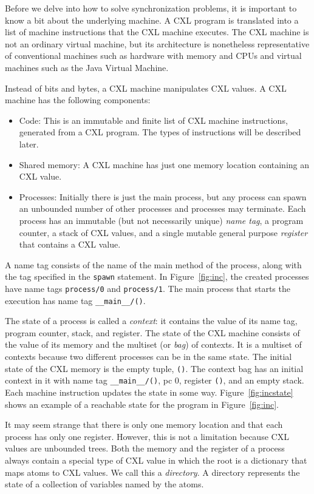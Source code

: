 \documentclass{report}
\begin{document}
Before we delve into how to solve synchronization problems, it is important
to know a bit about the underlying machine.  A CXL program is translated
into a list of machine instructions that the CXL machine executes.
The CXL machine is not an ordinary virtual machine, but its architecture
is nonetheless representative of conventional machines such as hardware
with memory and CPUs and virtual machines such as the Java Virtual Machine.

Instead of bits and bytes, a CXL machine manipulates CXL values.
A CXL machine has the following components:
\begin{itemize}
\item Code:  This is an immutable and finite list of CXL machine instructions,
generated from a CXL program.  The types of instructions will be described later.
\item Shared memory: A CXL machine has just one memory location containing
an CXL value.
\item Processes:  Initially there is just the main process, but any process
can spawn an unbounded number of other processes and processes may terminate.
Each process has an immutable (but not necessarily unique) \emph{name tag},
a program counter, a stack of CXL values,
and a single mutable general purpose \emph{register} that contains a CXL value.
\end{itemize}

A name tag consists of the name of the main method of the process,
along with the tag specified in the \texttt{spawn} statement.
In Figure~\ref{fig:inc}, the created processes have name tags
\texttt{process/0} and \texttt{process/1}.  The main process that
starts the execution has name tag \texttt{\_\_main\_\_/()}.

The state of a process is called a \emph{context}: it contains the value of
its name tag, program counter, stack, and register.
The state of the CXL machine
consists of the value of its memory and the multiset (or \emph{bag}) of
contexts.  It is a multiset of contexts because two different processes can
be in the same state.
The initial state of the CXL memory is the empty tuple, \texttt{()}.
The context bag has an initial context in it with name tag
\texttt{\_\_main\_\_/()}, pc 0, register \texttt{()}, and an empty stack.
Each machine instruction updates the state in some way.
Figure~\ref{fig:incstate} shows an example of a reachable state for 
the program in Figure~\ref{fig:inc}.


It may seem strange that there is only one memory location and that each
process has only one register.  However, this is not a limitation because
CXL values are unbounded trees.
Both the memory and the register of a process always contain
a special type of CXL value in which the root is a dictionary
that maps atoms to CXL values.  We call this a \emph{directory}.
A directory represents the state of a collection of variables named by the atoms.
\end{document}

